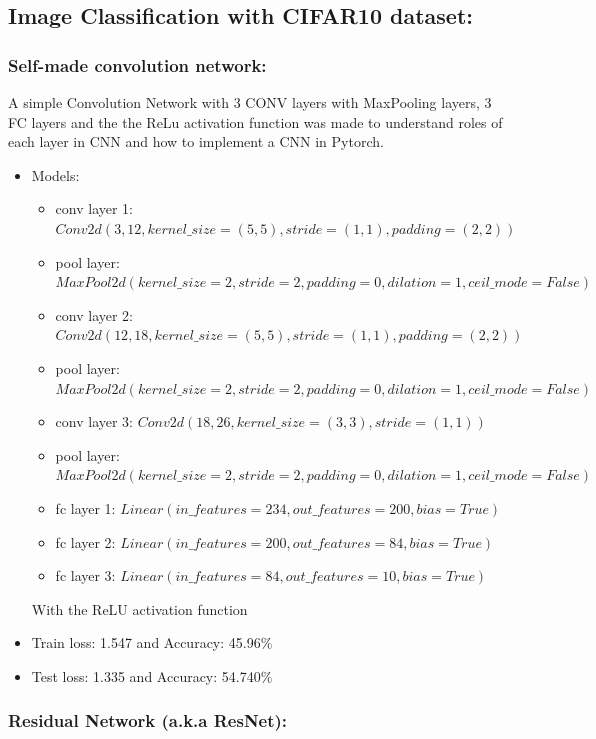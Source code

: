\subsection{Image Classification with CIFAR10 dataset:}
\subsubsection{Self-made convolution network:}
A simple Convolution Network with 3 CONV layers with MaxPooling layers, 3 FC layers and the the ReLu activation function was made to understand roles of each layer in CNN and how to implement a CNN in Pytorch.
\begin{itemize}
\item Models: \begin{itemize}
\item conv layer 1: $Conv2d(3, 12, kernel\_size=(5, 5), stride=(1, 1), padding=(2, 2))$
\item pool layer: $MaxPool2d(kernel\_size=2, stride=2, padding=0, dilation=1, ceil\_mode=False)$
\item conv layer 2: $Conv2d(12, 18, kernel\_size=(5, 5), stride=(1, 1), padding=(2, 2))$
\item pool layer: $MaxPool2d(kernel\_size=2, stride=2, padding=0, dilation=1, ceil\_mode=False)$
\item conv layer 3: $Conv2d(18, 26, kernel\_size=(3, 3), stride=(1, 1))$
\item pool layer: $MaxPool2d(kernel\_size=2, stride=2, padding=0, dilation=1, ceil\_mode=False)$
\item fc layer 1: $Linear(in\_features=234, out\_features=200, bias=True)$
\item fc layer 2: $Linear(in\_features=200, out\_features=84, bias=True)$
\item fc layer 3: $Linear(in\_features=84, out\_features=10, bias=True)$
\end{itemize}
With the ReLU activation function
\item Train loss: 1.547 and Accuracy: 45.96$\%$
\item Test loss: 1.335 and Accuracy: 54.740$\%$
\end{itemize}
\subsubsection{Residual Network (a.k.a ResNet):}
